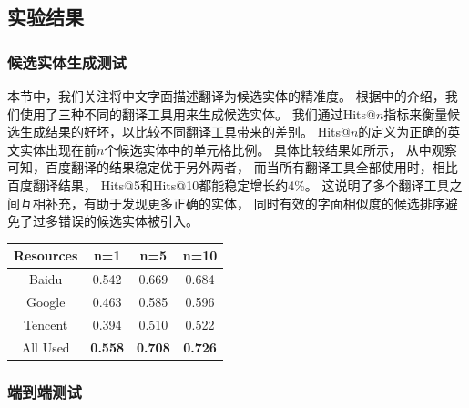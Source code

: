 \subsection{实验结果}

\subsubsection{候选实体生成测试}
\label{sec:tabel-exp-cand-gen-eval}


本节中，我们关注将中文字面描述翻译为候选实体的精准度。
根据中的介绍，我们使用了三种不同的翻译工具用来生成候选实体。
我们通过Hits@$n$指标来衡量候选生成结果的好坏，以比较不同翻译工具带来的差别。
Hits@$n$的定义为正确的英文实体出现在前$n$个候选实体中的单元格比例。
具体比较结果如所示，
从中观察可知，百度翻译的结果稳定优于另外两者，
而当所有翻译工具全部使用时，相比百度翻译结果，
Hits@5和Hits@10都能稳定增长约4\%。
这说明了多个翻译工具之间互相补充，有助于发现更多正确的实体，
同时有效的字面相似度的候选排序避免了过多错误的候选实体被引入。%

\begin{table}[ht]
    \centering
    \begin{tabular} {c|ccc}
        \hline
        Resources    &   n=1     &   n=5     &   n=10    \\
        \hline
        Baidu      &   0.542   &   0.669   &   0.684   \\
        Google     &   0.463   &   0.585   &   0.596   \\
        Tencent    &   0.394   &   0.510   &   0.522   \\
        \hline
        All Used    & \textbf{0.558}  & \textbf{0.708}  &  \textbf{0.726}   \\
        \hline
    \end{tabular}
    \label{tab:tabel-cand-gen-quality}
\end{table}



\subsubsection{端到端测试}
\label{sec:tabel-exp-e2e-results}


